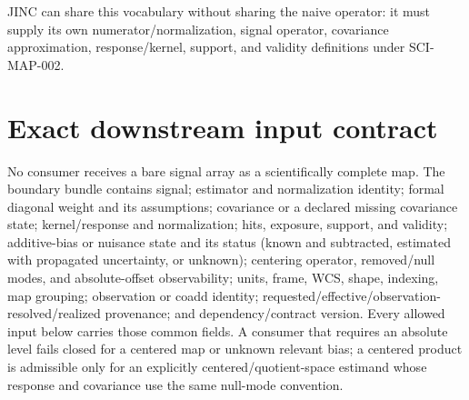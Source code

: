 \documentclass[11pt]{article}
\begin{document}
JINC can share this vocabulary without sharing the naive operator: it must
supply its own numerator/normalization, signal operator, covariance
approximation, response/kernel, support, and validity definitions under
SCI-MAP-002.

\section{Exact downstream input contract}

No consumer receives a bare signal array as a scientifically complete map. The
boundary bundle contains signal; estimator and normalization identity; formal
diagonal weight and its assumptions; covariance or a declared missing
covariance state; kernel/response and normalization; hits, exposure, support,
and validity; additive-bias or nuisance state and its status (known and
subtracted, estimated with propagated uncertainty, or unknown); centering
operator, removed/null modes, and absolute-offset observability; units, frame,
WCS, shape, indexing, map grouping; observation or coadd identity;
requested/effective/observation-resolved/realized provenance; and
dependency/contract version. Every allowed input below carries those common
fields. A consumer that requires an absolute level fails closed for a centered
map or unknown relevant bias; a centered product is admissible only for an
explicitly centered/quotient-space estimand whose response and covariance use
the same null-mode convention.
\end{document}
